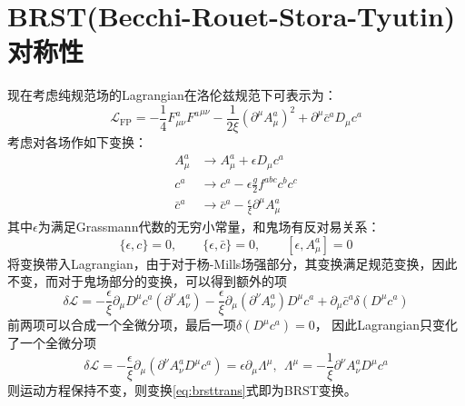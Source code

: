 \section{BRST(Becchi-Rouet-Stora-Tyutin)对称性}
现在考虑纯规范场的Lagrangian在洛伦兹规范下可表示为：
\begin{equation}
\mathscr{L}_\text{FP}=-\frac{1}{4}F^a_{\mu\nu}{F^a}^{\mu\nu}-\frac{1}{2\xi}(\partial^\mu A_\mu^a)^2+\partial^\mu\bar{c}^aD_\mu  c^a
\end{equation}
考虑对各场作如下变换：
\begin{equation}
\begin{split}
A^a_\mu&\rightarrow A^a_\mu+\epsilon D_\mu c^a\\
c^a&\rightarrow c^a-\epsilon 
\frac{g}{2} f^{abc} c^b c^c\\
\bar{c}^a&\rightarrow\bar{c}^a-\frac\epsilon\xi \partial^\mu A_\mu^a
\end{split}\label{eq:brsttrans}
\end{equation}
其中$\epsilon$为满足Grassmann代数的无穷小常量，和鬼场有反对易关系：
\begin{equation}
\{\epsilon,c\}=0,\qquad\{\epsilon,\bar{c}\}=0,\qquad[\epsilon,A_\mu^a]=0
\end{equation}
将变换带入Lagrangian，由于对于杨-Mills场强部分，其变换满足规范变换，因此不变，而对于鬼场部分的变换，可以得到额外的项
\begin{equation}
    \delta\mathscr{L} = -\frac\epsilon\xi\partial_\mu D^\mu c^a(\partial^\nu A^a_\nu) -\frac \epsilon\xi\partial_\mu(\partial^\nu A^a_\nu)  D^\mu c^a  + \partial_\mu \bar{c}^a \delta(D^\mu c^a)
\end{equation}
前两项可以合成一个全微分项，最后一项$\delta(D^\mu c^a)=0$，
因此Lagrangian只变化了一个全微分项
\begin{equation}
    \delta\mathscr{L} =-\frac\epsilon\xi\partial_\mu(\partial^\nu A_\nu ^a D^\mu c^a) = \epsilon\partial_\mu \Lambda^\mu,~~\Lambda^\mu = -\frac1\xi\partial^\nu A^a_\nu D^\mu c^a\label{eq:brsttotd}
\end{equation}
则运动方程保持不变，则变换\eqref{eq:brsttrans}式即为BRST变换。

